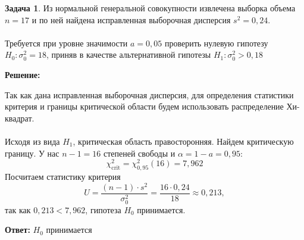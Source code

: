 \documentclass[a4paper,11pt]{article}
\newenvironment{shdd}{\begin{mdframed}[backgroundcolor=shadecolor]}{\end{mdframed}}
\theoremstyle{definition}
\newtheorem{problem}{Задача}\setlength{\parindent}{0pt}
\newenvironment{solution}
{\begin{shdd}
     \textbf{Решение:}\par\setlength{\parindent}{0pt}}
     {
\end{shdd}}
\newenvironment{answer}
{\par\noindent\textbf{Ответ:}}
{\par}
\begin{document}
    \vspace{10pt}
    \begin{problem}
        Из нормальной генеральной совокупности извлечена выборка объема \(n=17\) и по ней
        найдена исправленная выборочная дисперсия \(s^2 = 0,24\).
        \\
        \\
        Требуется при уровне значимости \(a = 0,05\) проверить нулевую гипотезу \(H_0: \sigma_0^2 = 18\),
        приняв в качестве альтернативной гипотезы \(H_1: \sigma_0^2 > 0,18\)

        \begin{solution}
            Так как дана исправленная выборочная дисперсия, для определения статистики критерия
            и границы критической области будем использовать распределение Хи-квадрат.
            \\
            \\
            Исходя из вида \(H_1\), критическая область правосторонняя.
            Найдем критическую границу. У нас \(n - 1 = 16\) степеней свободы и \( \alpha = 1 - a = 0,95 \):
            \[
                \chi^2_{\text{crit}} = \chi^2_{0,95}(16) = 7,962
            \]
            Посчитаем статистику критерия
            \[
                U = \frac{(n-1)\cdot s^2}{\sigma_0^2} = \frac{16 \cdot 0,24}{18} \approx 0,213,
            \]
            так как \(0,213 < 7,962\), гипотеза \(H_0\) принимается.
        \end{solution}

        \begin{answer}
            \(H_0\) принимается
        \end{answer}


    \end{problem}
\end{document}
